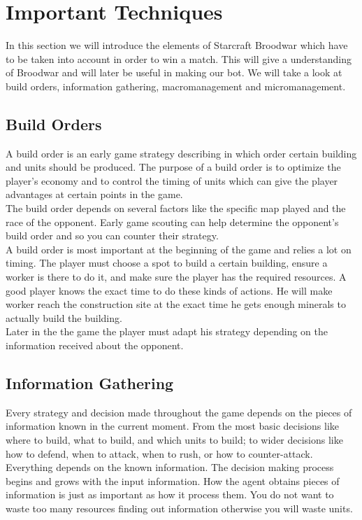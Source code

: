 \section{Important Techniques}
In this section we will introduce the elements of Starcraft Broodwar which have to be taken into account in order to win a match. This will give a understanding 
of Broodwar and will later be useful in making our bot. We will take a look at build orders, information gathering, macromanagement and
micromanagement.

	\subsection{Build Orders}
		A build order is an early game strategy describing in which order certain building and units should be produced\cite{wiki_build_order}. 
		The purpose of a build order is to optimize the player's economy and to control the timing of units which can give 
		the player advantages at certain points in the game.\\
		The build order depends on several factors like the specific map played and the race of the opponent. 
		Early game scouting can help determine the opponent's build order and so you can counter their strategy.\\
		
		A build order is most important at the beginning of the game and relies a lot on timing. 
		The player must choose a spot to build a certain building, ensure a worker is there to do it, 
		and make sure the player has the required resources. 
		A good player knows the exact time to do these kinds of actions. 
		He will make worker reach the construction site at the exact time he gets enough minerals to actually build the building.\\
		
		Later in the the game the player must adapt his strategy depending on the information received about the opponent.
	
	\subsection{Information Gathering}
		Every strategy and decision made throughout the game depends on the pieces of information 
		known in the current moment. From the most basic decisions like where to build, what to build, and
		which units to build; to wider decisions like how to defend, when to attack, when to rush, or how to counter-attack.
		Everything depends on the known information. The decision making process begins and grows with the input information.
		How the agent obtains pieces of information is just as important 
		as how it process them. You do not want to waste too many resources finding out information otherwise you will waste units. 
	
